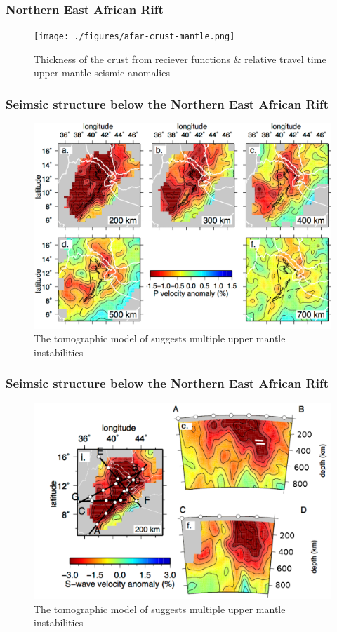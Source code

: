 \documentclass[aspectratio=169]{beamer}
\begin{document}
\begin{frame}
    \frametitle{Northern East African Rift}
    \begin{figure}
        \texttt{[image: ./figures/afar-crust-mantle.png]}
        \caption{Thickness of the crust from reciever functions \& relative travel time upper mantle seismic anomalies}
    \end{figure}
\end{frame}

\begin{frame}
    \frametitle{Seimsic structure below the Northern East African Rift}
    \begin{figure}
        \vspace{-0.3cm}
        \includegraphics[height=0.7\paperheight]{./figures/civiero-2016.png}
        \caption{The tomographic model of \cite{civiero-etal-2016} suggests multiple upper mantle instabilities}
    \end{figure}
\end{frame}

\begin{frame}
    \frametitle{Seimsic structure below the Northern East African Rift}
    \begin{figure}
        \vspace{-0.3cm}
        \includegraphics[height=0.7\paperheight]{./figures/chiara1.png}
        \caption{The tomographic model of \cite{civiero-etal-2016} suggests multiple upper mantle instabilities}
    \end{figure}
\end{frame}
\end{document}
